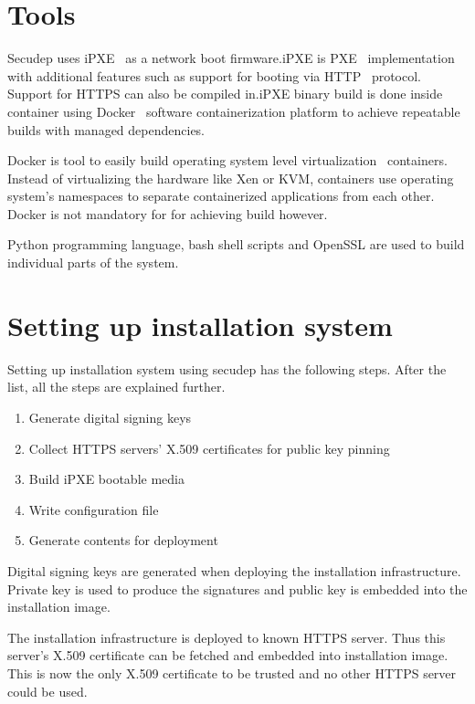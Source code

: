 \section{Tools}

Secudep uses iPXE~\cite{iPXE} as a network boot firmware.\@ iPXE is
PXE~\cite{PXEspec} implementation with additional features such as
support for booting via HTTP~\cite{RFC2616} protocol. Support for
HTTPS can also be compiled in.\@ iPXE binary build is done inside
container using Docker~\cite{Docker} software containerization
platform to achieve repeatable builds with managed dependencies.

Docker is tool to easily build operating system level
virtualization~\cite{Soltesz2007} containers. Instead of virtualizing
the hardware like Xen or KVM, containers use operating system's
namespaces to separate containerized applications from each
other. Docker is not mandatory for for achieving build however.

Python programming language, bash shell scripts and OpenSSL are used
to build individual parts of the system.

\section{Setting up installation system}

Setting up installation system using secudep has the following
steps. After the list, all the steps are explained further.

\begin{enumerate}
  \item Generate digital signing keys
  \item Collect HTTPS servers' X.509 certificates for public key pinning
  \item Build iPXE bootable media
  \item Write configuration file
  \item Generate contents for deployment
\end{enumerate}

Digital signing keys are generated when deploying the installation
infrastructure. Private key is used to produce the signatures and
public key is embedded into the installation image.

The installation infrastructure is deployed to known HTTPS
server. Thus this server's X.509 certificate can be fetched and
embedded into installation image. This is now the only X.509
certificate to be trusted and no other HTTPS server could be used.

